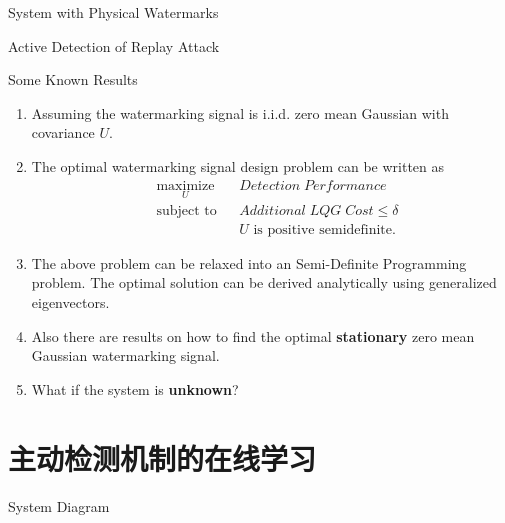 \documentclass[10pt]{beamer}
\newlength\figureheight
\newlength\figurewidth
\newcommand{\tikzdir}[1]{#1.tikz}
\newcommand{\inputtikz}[1]{}}
\begin{document}
\begin{frame}{System with Physical Watermarks}
    \begin{figure}[htpb]
      \begin{center}
	\inputtikz{replaywithphywatermark}
      \end{center}
    \end{figure}
\end{frame}

\begin{frame}{Active Detection of Replay Attack}
  \setlength{\figureheight}{6cm}
  \setlength{\figurewidth}{7cm}
    \begin{figure}[htpb]
      \begin{center}
	\inputtikz{replay1}
      \end{center}
    \end{figure}
\end{frame}

\begin{frame}{Some Known Results}
  \begin{enumerate}
  \item Assuming the watermarking signal is i.i.d. zero mean Gaussian with covariance $U$.
  \item The optimal watermarking signal design problem can be written as
    \begin{align*}
      &\mathop{\textrm{maximize}}\limits_{U}&
      & Detection\;Performance\\
      &\textrm{subject to}&
      & Additional\;LQG\;Cost \leq \delta \\
      &&& U \text{ is positive semidefinite.}
    \end{align*}
  \item The above problem can be relaxed into an Semi-Definite Programming problem. The optimal solution can be derived analytically using generalized eigenvectors.
  \item Also there are results on how to find the optimal \textbf{stationary} zero mean Gaussian watermarking signal.
  \item What if the system is \textbf{unknown}?
  \end{enumerate}
\end{frame}

\section{主动检测机制的在线学习}

\begin{frame}{System Diagram}
  \begin{figure}[htpb]
    \inputtikz{systemdiagram2}
  \end{figure}
\end{frame}
\end{document}
